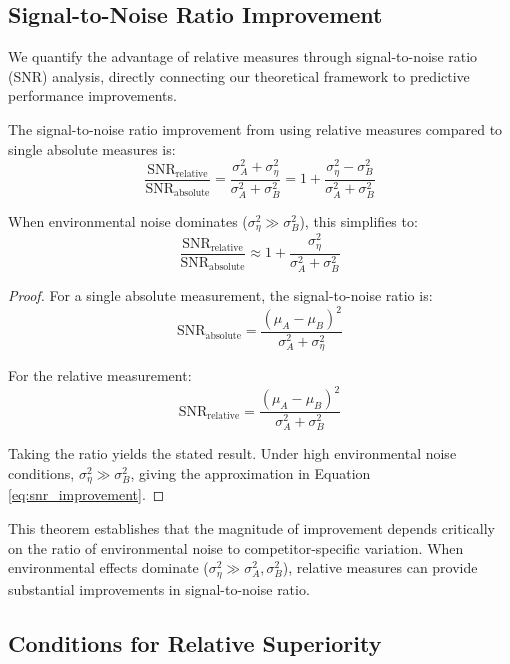 \subsection{Signal-to-Noise Ratio Improvement}

We quantify the advantage of relative measures through signal-to-noise ratio (SNR) analysis, directly connecting our theoretical framework to predictive performance improvements.

\begin{theorem}
\label{thm:snr_improvement}
The signal-to-noise ratio improvement from using relative measures compared to single absolute measures is:
\begin{equation}
\frac{\text{SNR}_{\text{relative}}}{\text{SNR}_{\text{absolute}}} = \frac{\sigma_A^2 + \sigma_\eta^2}{\sigma_A^2 + \sigma_B^2} = 1 + \frac{\sigma_\eta^2 - \sigma_B^2}{\sigma_A^2 + \sigma_B^2}
\end{equation}

When environmental noise dominates ($\sigma_\eta^2 \gg \sigma_B^2$), this simplifies to:
\begin{equation}
\frac{\text{SNR}_{\text{relative}}}{\text{SNR}_{\text{absolute}}} \approx 1 + \frac{\sigma_\eta^2}{\sigma_A^2 + \sigma_B^2} \label{eq:snr_improvement}
\end{equation}
\end{theorem}

\begin{proof}
For a single absolute measurement, the signal-to-noise ratio is:
$$\text{SNR}_{\text{absolute}} = \frac{(\mu_A - \mu_B)^2}{\sigma_A^2 + \sigma_\eta^2}$$

For the relative measurement:
$$\text{SNR}_{\text{relative}} = \frac{(\mu_A - \mu_B)^2}{\sigma_A^2 + \sigma_B^2}$$

Taking the ratio yields the stated result. Under high environmental noise conditions, $\sigma_\eta^2 \gg \sigma_B^2$, giving the approximation in Equation \ref{eq:snr_improvement}.
\end{proof}

This theorem establishes that the magnitude of improvement depends critically on the ratio of environmental noise to competitor-specific variation. When environmental effects dominate ($\sigma_\eta^2 \gg \sigma_A^2, \sigma_B^2$), relative measures can provide substantial improvements in signal-to-noise ratio.

\subsection{Conditions for Relative Superiority}


